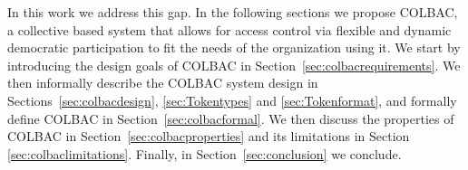In this work we address this gap. In the following sections we propose COLBAC, a
collective based system that allows for access control via flexible and dynamic
democratic participation to fit the needs of the organization using it. We start
by introducing the design goals of COLBAC in
Section~\ref{sec:colbacrequirements}. We then informally describe the COLBAC
system design in Sections~\ref{sec:colbacdesign}, \ref{sec:Tokentypes} and 
\ref{sec:Tokenformat}, and formally define COLBAC in
Section~\ref{sec:colbacformal}. We then discuss the properties of COLBAC in
Section~\ref{sec:colbacproperties} and its limitations in Section
\ref{sec:colbaclimitations}. Finally, in Section~\ref{sec:conclusion} we
conclude.
%
%
%
